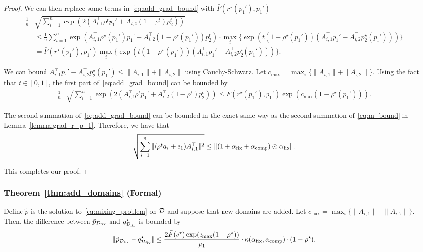 \begin{proof}
We can then replace some terms in~\eqref{eq:add_grad_bound} with $\bar{F}(r^\star(p_1'), p_1')$ 
\begin{align*}
    \frac{1}{n}&\sqrt{\sum_{i = 1}^n \exp(2(A_{i, 1}^\top \rho^t p_1' + A_{i, 2}^\top (1 - \rho^t) p_2^t))} \\
    &\le \frac{1}{n} \sum_{i = 1}^n \exp(A_{i, 1}^\top \rho^\star(p_1') p_1' + A_{i, 2}^\top (1 - \rho^\star(p_1')) p_2^t) \cdot \max_i \{\exp(t (1 - \rho^\star(p_1'))(A_{i, 1}^\top p_1' - A_{i, 2}^\top p_2^\star(p_1'))) \}\\
    &= \bar{F}(r^\star(p_1'), p_1') \max_i \{\exp(t (1 - \rho^\star(p_1'))(A_{i, 1}^\top p_1' - A_{i, 2}^\top p_2^\star(p_1'))) \}.
\end{align*}


We can bound $A_{i, 1}^\top p_1' - A_{i, 2}^\top p_2^\star(p_1') \le \|A_{i, 1}\| + \|A_{i, 2}\|$ using Cauchy-Schwarz. Let $c_{\max} = \max_i \{ \|A_{i, 1}\| + \|A_{i, 2}\|\}$.
Using the fact that $t\in[0, 1]$, the first part of~\eqref{eq:add_grad_bound} can be bounded by
\begin{align*}
    \frac{1}{n}&\sqrt{\sum_{i = 1}^n \exp(2(A_{i, 1}^\top \rho^t p_1' + A_{i, 2}^\top (1 - \rho^t) p_2^t))} \le \bar{F}(r^\star(p_1'), p_1') \exp( c_{\max}(1 - \rho^\star(p_1'))).
\end{align*}

The second summation of~\eqref{eq:add_grad_bound} can be bounded in the exact same way as the second summation of~\eqref{eq:m_bound} in Lemma~\ref{lemma:grad_r_p_1}. Therefore, we have that
\begin{align*}
    \sqrt{\sum_{i = 1}^n \|(\rho^t a_i + e_1) A_{i, 1}^\top\|^2} \le  \|(1 + \alpha_{\text{fix}} + \alpha_{\text{comp}}) \odot \alpha_{\text{fix}} \|.
\end{align*}

This completes our proof.
\end{proof}


\subsubsection{Theorem~\ref{thm:add_domains} (Formal)}

\begin{theorem}
    Define $\tilde{p}$ is the solution to~\eqref{eq:mixing_problem} on $\mathcal{D}$ and suppose that new domains are added. Let $c_{\max} = \max_i \{\|A_{i, 1}\| + \|A_{i, 2}\|\}$. Then, the difference between $\tilde{p}_{\mathcal{D}_{\text{fix}}}$ and $q^\star_{\mathcal{D}_{\text{fix}}}$ is bounded by
    \begin{align*}
        \|\tilde{p}_{\mathcal{D}_{\text{fix}}} - q^\star_{\mathcal{D}_{\text{fix}}}\| \le \frac{2\bar{F}(q^\star) \exp( c_{\max}(1 - \rho^\star))}{\mu_1}   \cdot \kappa(\alpha_{\text{fix}}, \alpha_{\text{comp}}) \cdot (1 - \rho^\star).
    \end{align*}
\end{theorem}

